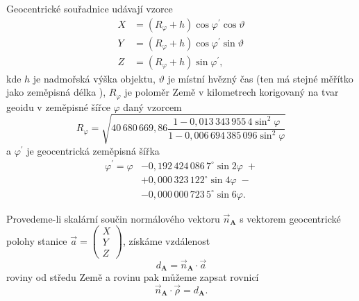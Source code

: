 Geocentrické souřadnice udávají vzorce \cite{ceplecha}
\begin{equation}
    \begin{aligned}
        X & =(R_\varphi+h)\cos{\varphi^\prime}\cos{\vartheta} \\
        Y & =(R_\varphi+h)\cos{\varphi^\prime}\sin{\vartheta} \\
        Z & =(R_\varphi+h)\sin{\varphi^\prime}\text{,}
    \end{aligned}
    \label{eqn:photo:geo_xyz}
\end{equation}
kde $h$ je nadmořská výška objektu, $\vartheta$ je místní hvězný čas (ten má stejné měřítko jako zeměpisná délka \cite{ceplecha}), $R_\varphi$ je poloměr Země v kilometrech korigovaný na tvar geoidu v zeměpisné šířce $\varphi$ daný vzorcem \cite{ceplecha}
\begin{equation}
    R_\varphi=\sqrt{40\,680\,669{,}86\frac{1-0{,}013\,343\,955\,4 \sin^2{\varphi}}{1-0{,}006\,694\,385\,096 \sin^2{\varphi}}}
\end{equation}
a $\varphi^\prime$ je geocentrická zeměpisná šířka \cite{ceplecha}
\begin{equation}
    \begin{aligned}
        \varphi^\prime=\varphi & -0{,}192\,424\,086\,7^\circ \sin{2\varphi}\;+      \\
                               & +0{,}000\,323\,122^\circ \sin{4\varphi}\;-         \\
                               & -0{,}000\,000\,723\,5^\circ \sin{6\varphi}\text{.}
    \end{aligned}
\end{equation}

Provedeme-li skalární součin normálového vektoru $\vec{n}_\mathbf{A}$ s vektorem geocentrické polohy stanice $\vec{a}=\left(\begin{smallmatrix}
            X\\Y\\Z
        \end{smallmatrix}\right)$, získáme vzdálenost
\begin{equation}
    d_\mathbf{A}=\vec{n}_\mathbf{A}\cdot\vec{a}
\end{equation}
roviny od středu Země \cite{ceplecha} a rovinu pak můžeme zapsat rovnicí \cite{ceplecha}
\begin{equation}
    \vec{n}_\mathbf{A}\cdot\vec{\rho}=d_\mathbf{A}\text{.}
    \label{eqn:photo:plane_a}
\end{equation}

